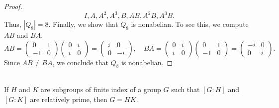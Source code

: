 \documentclass{article}
\begin{document}
\begin{proof}
    \[
        I, A, A^2, A^3, B, AB, A^2B, A^3B.
    \]
    Thus, $|Q_8| = 8$. Finally, we show that $Q_8$ is nonabelian. To see this, we compute $AB$ and $BA$.
    \[
        AB = \begin{pmatrix}
            0 & 1 \\
            -1 & 0
        \end{pmatrix} \begin{pmatrix}
            0 & i \\
            i & 0
        \end{pmatrix} = \begin{pmatrix}
            i & 0 \\
            0 & -i
        \end{pmatrix}, \quad
        BA = \begin{pmatrix}
            0 & i \\
            i & 0
        \end{pmatrix} \begin{pmatrix}
            0 & 1 \\
            -1 & 0
        \end{pmatrix} = \begin{pmatrix}
            -i & 0 \\
            0 & i
        \end{pmatrix}.
    \]
    Since $AB \neq BA$, we conclude that $Q_8$ is nonabelian.
\end{proof}






\begin{problem}[Exercise 1.4.8] \\
    If $H$ and $K$ are subgroups of finite index of a group $G$ such that $\left[ G : H \right]$ and $\left[ G : K \right]$ are relatively prime, then $G = HK$.
\end{problem}
\end{document}
